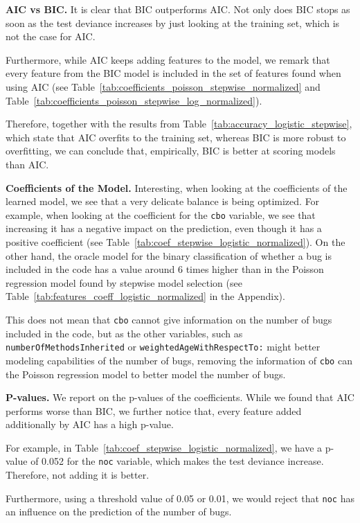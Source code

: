 \textbf{AIC vs BIC.}
It is clear that BIC outperforms AIC. Not only does BIC stops as soon as the test deviance increases by just looking at the training set, which is not the case for AIC.

Furthermore, while AIC keeps adding features to the model, we remark that every feature from the BIC model is included in the set of features found when using AIC (see Table~\ref{tab:coefficients_poisson_stepwise_normalized} and Table~\ref{tab:coefficients_poisson_stepwise_log_normalized}).

Therefore, together with the results from Table~\ref{tab:accuracy_logistic_stepwise}, which state that AIC overfits to the training set, whereas BIC is more robust to overfitting, we can conclude that, empirically, BIC is better at scoring models than AIC.

\textbf{Coefficients of the Model.}
Interesting, when looking at the coefficients of the learned model, we see that a very delicate balance is being optimized. For example, when looking at the coefficient for the \texttt{cbo} variable, we see that increasing it has a negative impact on the prediction, even though it has a positive coefficient (see Table~\ref{tab:coef_stepwise_logistic_normalized}).
On the other hand, the oracle model for the binary classification of whether a bug is included in the code has a value around 6 times higher than in the Poisson regression model found by stepwise model selection (see Table~\ref{tab:features_coeff_logistic_normalized} in the Appendix).

This does not mean that \texttt{cbo} cannot give information on the number of bugs included in the code, but as the other variables, such as \texttt{numberOfMethodsInherited} or \texttt{weightedAgeWithRespectTo:} might better modeling capabilities of the number of bugs, removing the information of \texttt{cbo} can the Poisson regression model to better model the number of bugs.

\textbf{P-values.}
We report on the p-values of the coefficients.
While we found that AIC performs worse than BIC, we further notice that, every feature added additionally by AIC has a high p-value. 

For example, in Table~\ref{tab:coef_stepwise_logistic_normalized}, we have a p-value of 0.052 for the \texttt{noc} variable, which makes the test deviance increase. Therefore, not adding it is better.

Furthermore, using a threshold value of 0.05 or 0.01, we would reject that \texttt{noc} has an influence on the prediction of the number of bugs.


